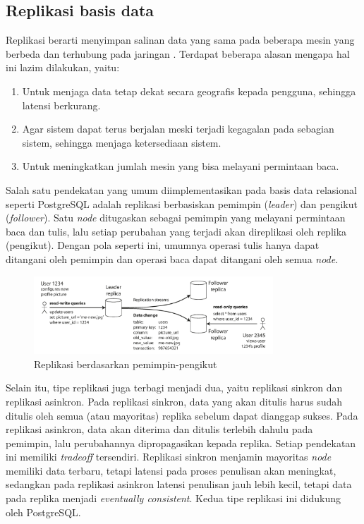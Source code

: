 \subsection{Replikasi basis data}

Replikasi berarti menyimpan salinan data yang sama pada beberapa mesin yang berbeda dan terhubung pada jaringan \parencite{dataIntensiveApplications}. Terdapat beberapa alasan mengapa hal ini lazim dilakukan, yaitu:

\begin{enumerate}
    \item Untuk menjaga data tetap dekat secara geografis kepada pengguna, sehingga latensi berkurang.
    \item Agar sistem dapat terus berjalan meski terjadi kegagalan pada sebagian sistem, sehingga menjaga ketersediaan sistem.
    \item Untuk meningkatkan jumlah mesin yang bisa melayani permintaan baca.
\end{enumerate}

Salah satu pendekatan yang umum diimplementasikan pada basis data relasional seperti PostgreSQL adalah replikasi berbasiskan pemimpin (\textit{leader}) dan pengikut (\textit{follower}). Satu \textit{node} ditugaskan sebagai pemimpin yang melayani permintaan baca dan tulis, lalu setiap perubahan yang terjadi akan direplikasi oleh replika (pengikut). Dengan pola seperti ini, umumnya operasi tulis hanya dapat ditangani oleh pemimpin dan operasi baca dapat ditangani oleh semua \textit{node}.

\begin{figure}[htbp]
    \centering
    \includegraphics[width=0.8\textwidth]{resources/chapter-2/leader-based-replication.png}
    \caption{Replikasi berdasarkan pemimpin-pengikut \parencite{dataIntensiveApplications}}
    \label{fig:leader-based-replication}
\end{figure}

Selain itu, tipe replikasi juga terbagi menjadi dua, yaitu replikasi sinkron dan replikasi asinkron. Pada replikasi sinkron, data yang akan ditulis harus sudah ditulis oleh semua (atau mayoritas) replika sebelum dapat dianggap sukses. Pada replikasi asinkron, data akan diterima dan ditulis terlebih dahulu pada pemimpin, lalu perubahannya dipropagasikan kepada replika. Setiap pendekatan ini memiliki \textit{tradeoff} tersendiri. Replikasi sinkron menjamin mayoritas \textit{node} memiliki data terbaru, tetapi latensi pada proses penulisan akan meningkat, sedangkan pada replikasi asinkron latensi penulisan jauh lebih kecil, tetapi data pada replika menjadi \textit{eventually consistent}. Kedua tipe replikasi ini didukung oleh PostgreSQL.
